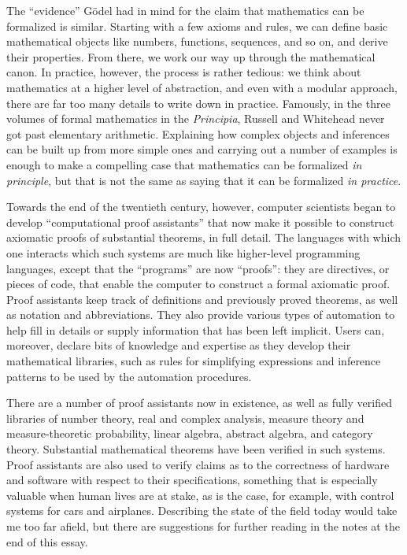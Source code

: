 \documentclass[12pt]{article}
\begin{document}
The ``evidence'' G\"odel had in mind for the claim that mathematics can be formalized is similar. Starting with a few axioms and rules, we can define basic mathematical objects like numbers, functions, sequences, and so on, and derive their properties. From there, we work our way up through the mathematical canon. In practice, however, the process is rather tedious: we think about mathematics at a higher level of abstraction, and even with a modular approach, there are far too many details to write down in practice. Famously, in the three volumes of formal mathematics in the \emph{Principia}, Russell and Whitehead never got past elementary arithmetic. Explaining how complex objects and inferences can be built up from more simple ones and carrying out a number of examples is enough to make a compelling case that mathematics can be formalized \emph{in principle}, but that is not the same as saying that it can be formalized \emph{in practice}.

Towards the end of the twentieth century, however, computer scientists began to develop ``computational proof assistants'' that now make it possible to construct axiomatic proofs of substantial theorems, in full detail. The languages with which one interacts which such systems are much like higher-level programming languages, except that the ``programs'' are now ``proofs'': they are directives, or pieces of code, that enable the computer to construct a formal axiomatic proof. Proof assistants keep track of definitions and previously proved theorems, as well as notation and abbreviations. They also provide various types of automation to help fill in details or supply information that has been left implicit. Users can, moreover, declare bits of knowledge and expertise as they develop their mathematical libraries, such as rules for simplifying expressions and inference patterns to be used by the automation procedures.

There are a number of proof assistants now in existence, as well as fully verified libraries of number theory, real and complex analysis, measure theory and measure-theoretic probability, linear algebra, abstract algebra, and category theory. Substantial mathematical theorems have been verified in such systems. Proof assistants are also used to verify claims as to the correctness of hardware and software with respect to their specifications, something that is especially valuable when human lives are at stake, as is the case, for example, with control systems for cars and airplanes. Describing the state of the field today would take me too far afield, but there are suggestions for further reading in the notes at the end of this essay.
\end{document}
